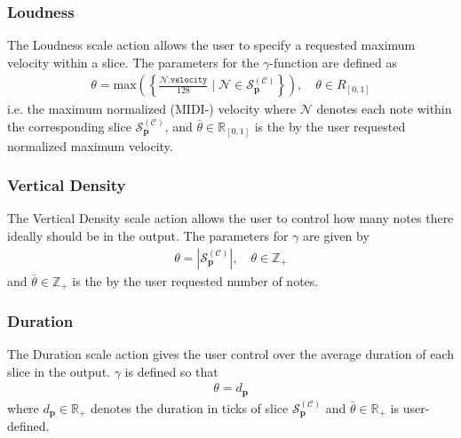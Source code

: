 	
\subsubsection{Loudness}
The Loudness scale action allows the user to specify a requested maximum velocity within a slice. The parameters for the $\gamma$-function are defined as
	\begin{align}
		\theta = \text{max}\left( \left\lbrace \frac{\mathcal N\texttt{.velocity}}{128} \;\vert\; \mathcal N \in \mathcal S_{\bm p}^{(\mathcal C)} \right\rbrace\right), \quad \theta \in R_{[0,1]}
	\end{align}
	i.e. the maximum normalized (MIDI-) velocity where $\mathcal N$ denotes each note within the corresponding slice $\mathcal S^{(\mathcal C)}_{\bm p}$, and $\bar{\theta} \in \mathbb R_{[0,1]}$ is the by the user requested normalized maximum velocity.
	
\subsubsection{Vertical Density} 
The Vertical Density scale action allows the user to control how many notes there ideally should be in the output. The parameters for $\gamma$ are given by
	\begin{align}
		\theta = \left\lvert \mathcal S^{(\mathcal C)}_{\bm p}\right\rvert, \quad \theta \in \mathbb Z_+	
	\end{align}
	and $\bar{\theta} \in \mathbb Z_+$ is the by the user requested number of notes.
	
\subsubsection{Duration}
The Duration scale action gives the user control over the average duration of each slice in the output. $\gamma$ is defined so that
	\begin{align}
		\theta = d_{\bm p}
	\end{align}
	where $d_{\bm p} \in \mathbb R_+$ denotes the duration in ticks of slice $\mathcal S^{(\mathcal C)}_{\bm p}$ and $\bar{\theta} \in \mathbb R_+$ is user-defined.


